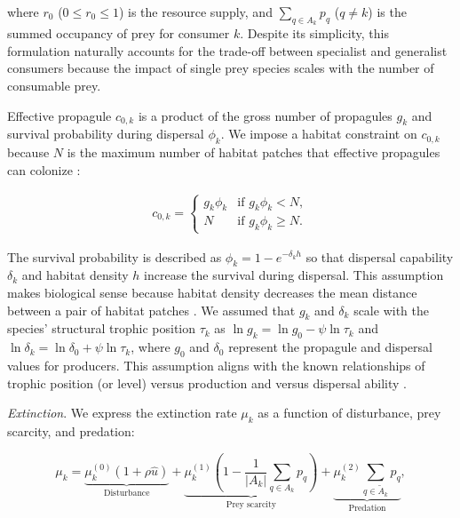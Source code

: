 \documentclass[11pt, class=article, crop=false]{standalone}
\begin{document}
where $r_0$ ($0 \le r_0 \le 1$) is the resource supply, and $\sum_{q \in A_{k}} p_{q}$ ($q \ne k$) is the summed occupancy of prey for consumer $k$.
Despite its simplicity, this formulation naturally accounts for the trade-off between specialist and generalist consumers because the impact of single prey species scales with the number of consumable prey.

Effective propagule $c_{0,k}$ is a product of the gross number of propagules $g_k$ and survival probability during dispersal $\phi_k$.
We impose a habitat constraint on $c_{0,k}$ because $N$ is the maximum number of habitat patches that effective propagules can colonize \citep{takimoto_effects_2012, terui_spatial_2019}:

\begin{align}
    c_{0, k} = 
    \begin{cases}
        g_k \phi_k & \text{if $g_k \phi_k < N$},\\
        N & \text{if $g_k \phi_k \ge N$}.
    \end{cases}
    \label{eq:c0-prod-method}
\end{align}

The survival probability is described as $\phi_k = 1 - e^{-\delta_k h}$ so that dispersal capability $\delta_k$ and habitat density $h$ increase the survival during dispersal.
This assumption makes biological sense because habitat density decreases the mean distance between a pair of habitat patches \citep{terui_spatial_2019}.
We assumed that $g_k$ and $\delta_k$ scale with the species' structural trophic position $\tau_k$ as $\ln g_k = \ln g_0 - \psi \ln \tau_k$ and $\ln \delta_k = \ln \delta_0 + \psi \ln \tau_k$, where $g_0$ and $\delta_0$ represent the propagule and dispersal values for producers.
This assumption aligns with the known relationships of trophic position (or level) versus production \citep{finlay_stream_2011} and versus dispersal ability \citep{mccann_dynamics_2005}.

\textit{Extinction}. We express the extinction rate $\mu_k$ as a function of disturbance, prey scarcity, and predation:

\begin{equation}
    \mu_{k} = 
        \underbrace{\mu_{k}^{(0)} (1 + \rho \hat{u})}_{\text{Disturbance}} + 
        \underbrace{\mu_{k}^{(1)} \left(1 - \frac{1}{|A_{k}|}\sum_{q\in A_{k}} p_{q}\right)}_{\text{Prey scarcity}} + 
        \underbrace{\mu_{k}^{(2)} \sum_{q \in \tilde{A}_{k}} p_{q}}_{\text{Predation}},
    \label{eq:extn}    
\end{equation}
\end{document}

